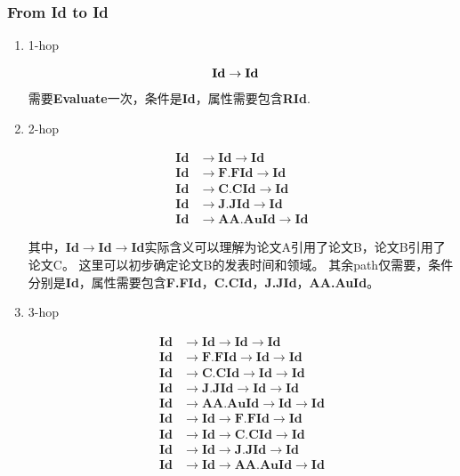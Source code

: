 \documentclass[hyperref,UTF8]{ctexart}
\theoremstyle{definition}
\theoremstyle{remark}
\numberwithin{equation}{subsection}
\newcommand{\Emph}{\textbf}
\newcommand{\resetcounter}{\setcounter{equation}{0}}
\newcommand{\Evaluate}{\Emph{Evaluate}}
\newcommand{\Id}{\Emph{Id}}
\newcommand{\RId}{\Emph{RId}}
\newcommand{\FFId}{\Emph{F.FId}}
\newcommand{\CCId}{\Emph{C.CId}}
\newcommand{\JJId}{\Emph{J.JId}}
\newcommand{\AAAuId}{\Emph{AA.AuId}}
\begin{document}
\subsubsection{From \Emph{Id} to \Emph{Id}}
\label{subsub:Id2Id}	

	\begin{enumerate}[(1)]
		
		\item 1-hop
		
		\begin{align}
		\resetcounter
			\Id &\rightarrow \Id	\label{equ:id-id}
		\end{align}
		需要\Evaluate 一次，条件是\Id ，属性需要包含\RId.
		
		\item 2-hop
		
		\begin{align}
			\Id &\rightarrow \Id \rightarrow \Id	\label{equ:id-id-id}	\\
			\Id &\rightarrow \FFId \rightarrow \Id	\label{equ:id-fid-id}	\\
			\Id &\rightarrow \CCId \rightarrow \Id	\label{equ:id-cid-id}	\\
			\Id &\rightarrow \JJId \rightarrow \Id	\label{equ:id-jid-id}	\\
			\Id &\rightarrow \AAAuId \rightarrow \Id \label{equ:id-auid-id}
		\end{align}
		
		其中，$\Id \rightarrow \Id \rightarrow \Id$实际含义可以理解为论文A引用了论文B，论文B引用了论文C。
		这里可以初步确定论文B的发表时间和领域。
		其余path仅需要，条件分别是\Id，属性需要包含\FFId，\CCId，\JJId，\AAAuId。
		
		\item 3-hop
		
		\begin{align}
			\Id &\rightarrow \Id 	\rightarrow 	\Id	\rightarrow \Id		\label{equ:id-id-id-id}		\\
			\Id &\rightarrow \FFId 	\rightarrow 	\Id	\rightarrow \Id		\label{equ:id-fid-id-id}	\\
			\Id &\rightarrow \CCId 	\rightarrow 	\Id	\rightarrow \Id		\label{equ:id-cid-id-id}	\\
			\Id &\rightarrow \JJId 	\rightarrow 	\Id	\rightarrow \Id		\label{equ:id-jid-id-id}	\\
			\Id &\rightarrow \AAAuId \rightarrow 	\Id	\rightarrow \Id		\label{equ:id-auid-id-id}	\\
			\Id &\rightarrow \Id 	\rightarrow	\FFId \rightarrow \Id		\label{equ:id-id-fid-id}	\\
			\Id &\rightarrow \Id 	\rightarrow	\CCId \rightarrow \Id		\label{equ:id-id-cid-id}	\\
			\Id &\rightarrow \Id 	\rightarrow	\JJId \rightarrow \Id		\label{equ:id-id-jid-id}	\\
			\Id &\rightarrow \Id 	\rightarrow	\AAAuId \rightarrow \Id		\label{equ:id-id-auid-id}
		\end{align}
		

\end{enumerate}
\end{document}
